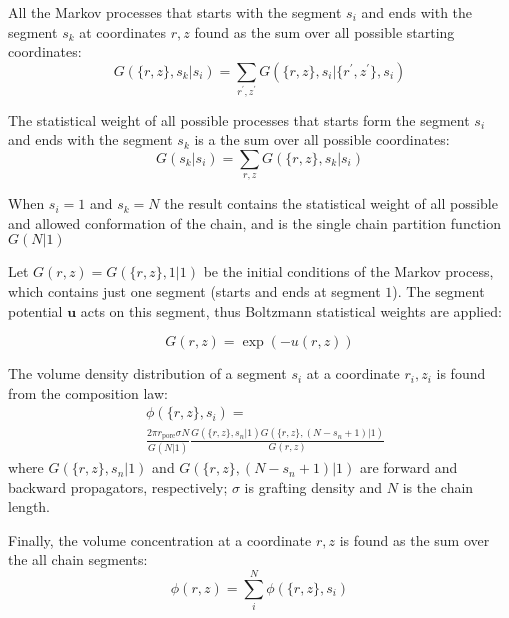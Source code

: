 \documentclass[10pt, a4paper]{article}
\begin{document}
\begin{multicols}{2}
All the Markov processes that starts with the segment $s_{i}$ and ends with the segment $s_{k}$ at coordinates ${r, z}$ found as the sum over all possible starting coordinates:
\begin{equation}
    G(\{r, z\}, s_{k} | s_{i}) = \sum_{r^{\prime}, z^{\prime}} G(\{r, z\}, s_{i} | \{r^{\prime}, z^{\prime}\}, s_{i})
\end{equation}

The statistical weight of all possible processes that starts form the segment $s_{i}$ and ends with the segment $s_{k}$ is a the sum over all possible coordinates:
\begin{equation}
    G(s_{k} | s_{i}) = \sum_{r, z} G(\{r, z\}, s_{k} | s_{i})
\end{equation}

When $s_{i}=1$ and $s_{k}=N$ the result contains the statistical weight of all possible and allowed conformation of the chain, and is the single chain partition function $G(N|1)$

Let $G(r, z) = G(\{r, z\}, 1|1)$ be the initial conditions of the Markov process, which contains just one segment (starts and ends at segment $1$).
The segment potential $\mathbf{u}$ acts on this segment, thus Boltzmann statistical weights are applied:

\begin{equation}
    G(r, z) = \exp(-u(r,z))
\end{equation}

The volume density distribution of a segment $s_i$ at a coordinate $r_{i}, z_{i}$ is found from the composition law:
\begin{equation}
    \label{eq:propagation}
    \begin{aligned}
        &\phi(\{r, z\}, s_{i}) = \\
        &\frac{2 \pi r_{\textrm{pore}} \sigma N}{G(N|1)}
        \frac{G(\{r, z\}, s_n | 1) G(\{r, z\}, (N-s_n+1) | 1)}{G(r, z)}
    \end{aligned}
\end{equation}
where $G(\{r, z\}, s_n | 1)$ and $G(\{r, z\}, (N-s_n+1) | 1)$ are forward and backward propagators, respectively; $\sigma$ is grafting density and $N$ is the chain length.

Finally, the volume concentration at a coordinate $r, z$ is found as the sum over the all chain segments:
\begin{equation}
    \phi(r, z) = \sum_{i}^{N} \phi(\{r, z\}, s_{i})
\end{equation}


\end{multicols}
\end{document}
